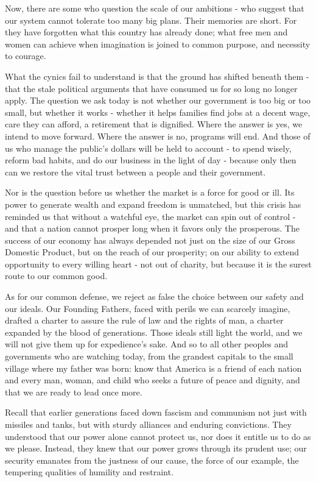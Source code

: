 \documentclass[12pt,a4paper,onecolumn]{article}
\begin{document}
\begin{sffamily}
Now, there are some who question the scale of our ambitions - who suggest that our system cannot
tolerate too many big plans. Their memories are short. For they have forgotten what this country has
already done; what free men and women can achieve when imagination is joined to common purpose, and
necessity to courage.

What the cynics fail to understand is that the ground has shifted beneath them - that the stale
political arguments that have consumed us for so long no longer apply. The question we ask today is
not whether our government is too big or too small, but whether it works - whether it helps families
find jobs at a decent wage, care they can afford, a retirement that is dignified. Where the answer
is yes, we intend to move forward. Where the answer is no, programs will end. And those of us who
manage the public's dollars will be held to account - to spend wisely, reform bad habits, and do our
business in the light of day - because only then can we restore the vital trust between a people and
their government.

Nor is the question before us whether the market is a force for good or ill. Its power to generate
wealth and expand freedom is unmatched, but this crisis has reminded us that without a watchful eye,
the market can spin out of control - and that a nation cannot prosper long when it favors only the
prosperous. The success of our economy has always depended not just on the size of our Gross
Domestic Product, but on the reach of our prosperity; on our ability to extend opportunity to every
willing heart - not out of charity, but because it is the surest route to our common good.

As for our common defense, we reject as false the choice between our safety and our ideals. Our
Founding Fathers, faced with perils we can scarcely imagine, drafted a charter to assure the rule of
law and the rights of man, a charter expanded by the blood of generations. Those ideals still light
the world, and we will not give them up for expedience's sake. And so to all other peoples and
governments who are watching today, from the grandest capitals to the small village where my father
was born: know that America is a friend of each nation and every man, woman, and child who seeks a
future of peace and dignity, and that we are ready to lead once more.

Recall that earlier generations faced down fascism and communism not just with missiles and tanks,
but with sturdy alliances and enduring convictions. They understood that our power alone cannot
protect us, nor does it entitle us to do as we please. Instead, they knew that our power grows
through its prudent use; our security emanates from the justness of our cause, the force of our
example, the tempering qualities of humility and restraint.


\end{sffamily}
\end{document}
